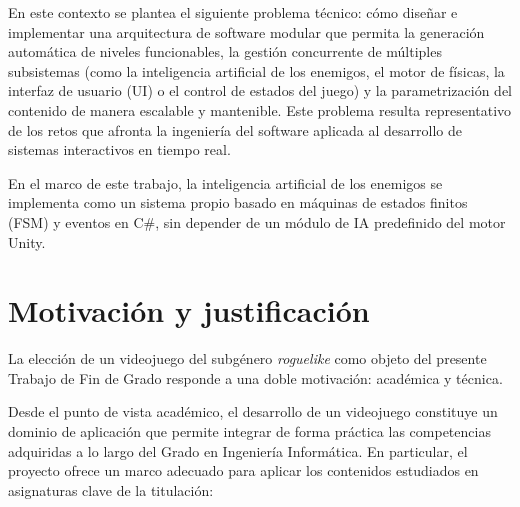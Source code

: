 En este contexto se plantea el siguiente problema técnico: cómo diseñar e implementar una arquitectura de software modular que permita la generación automática de niveles funcionables, la gestión concurrente de múltiples subsistemas (como la inteligencia artificial de los enemigos, el motor de físicas, la interfaz de usuario (UI) o el control de estados del juego) y la parametrización del contenido de manera escalable y mantenible. Este problema resulta representativo de los retos que afronta la ingeniería del software aplicada al desarrollo de sistemas interactivos en tiempo real.

En el marco de este trabajo, la inteligencia artificial de los enemigos se implementa como un sistema propio basado en máquinas de estados finitos (FSM) y eventos en C\#, sin depender de un módulo de IA predefinido del motor Unity.

\section{Motivación y justificación}


La elección de un videojuego del subgénero \textit{roguelike} como objeto del presente Trabajo de Fin de Grado responde a una doble motivación: académica y técnica.

Desde el punto de vista académico, el desarrollo de un videojuego constituye un dominio de aplicación que permite integrar de forma práctica las competencias adquiridas a lo largo del Grado en Ingeniería Informática. En particular, el proyecto ofrece un marco adecuado para aplicar los contenidos estudiados en asignaturas clave de la titulación:

